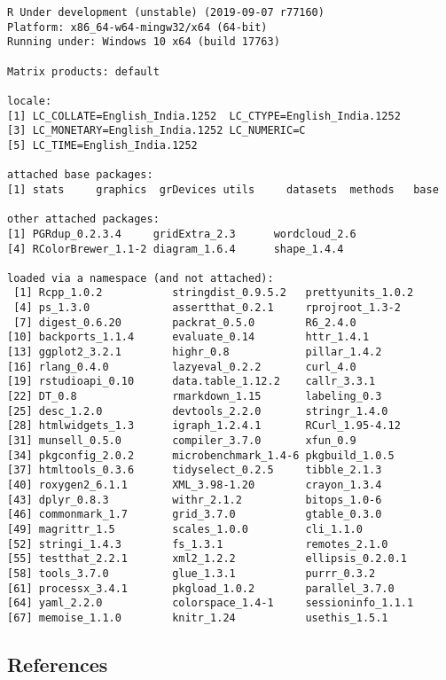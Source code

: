 \documentclass[]{article}
\begin{document}
\begin{verbatim}
R Under development (unstable) (2019-09-07 r77160)
Platform: x86_64-w64-mingw32/x64 (64-bit)
Running under: Windows 10 x64 (build 17763)

Matrix products: default

locale:
[1] LC_COLLATE=English_India.1252  LC_CTYPE=English_India.1252   
[3] LC_MONETARY=English_India.1252 LC_NUMERIC=C                  
[5] LC_TIME=English_India.1252    

attached base packages:
[1] stats     graphics  grDevices utils     datasets  methods   base     

other attached packages:
[1] PGRdup_0.2.3.4     gridExtra_2.3      wordcloud_2.6     
[4] RColorBrewer_1.1-2 diagram_1.6.4      shape_1.4.4       

loaded via a namespace (and not attached):
 [1] Rcpp_1.0.2           stringdist_0.9.5.2   prettyunits_1.0.2   
 [4] ps_1.3.0             assertthat_0.2.1     rprojroot_1.3-2     
 [7] digest_0.6.20        packrat_0.5.0        R6_2.4.0            
[10] backports_1.1.4      evaluate_0.14        httr_1.4.1          
[13] ggplot2_3.2.1        highr_0.8            pillar_1.4.2        
[16] rlang_0.4.0          lazyeval_0.2.2       curl_4.0            
[19] rstudioapi_0.10      data.table_1.12.2    callr_3.3.1         
[22] DT_0.8               rmarkdown_1.15       labeling_0.3        
[25] desc_1.2.0           devtools_2.2.0       stringr_1.4.0       
[28] htmlwidgets_1.3      igraph_1.2.4.1       RCurl_1.95-4.12     
[31] munsell_0.5.0        compiler_3.7.0       xfun_0.9            
[34] pkgconfig_2.0.2      microbenchmark_1.4-6 pkgbuild_1.0.5      
[37] htmltools_0.3.6      tidyselect_0.2.5     tibble_2.1.3        
[40] roxygen2_6.1.1       XML_3.98-1.20        crayon_1.3.4        
[43] dplyr_0.8.3          withr_2.1.2          bitops_1.0-6        
[46] commonmark_1.7       grid_3.7.0           gtable_0.3.0        
[49] magrittr_1.5         scales_1.0.0         cli_1.1.0           
[52] stringi_1.4.3        fs_1.3.1             remotes_2.1.0       
[55] testthat_2.2.1       xml2_1.2.2           ellipsis_0.2.0.1    
[58] tools_3.7.0          glue_1.3.1           purrr_0.3.2         
[61] processx_3.4.1       pkgload_1.0.2        parallel_3.7.0      
[64] yaml_2.2.0           colorspace_1.4-1     sessioninfo_1.1.1   
[67] memoise_1.1.0        knitr_1.24           usethis_1.5.1       
\end{verbatim}

\hypertarget{references}{%
\subsection*{References}\label{references}}
\end{document}

